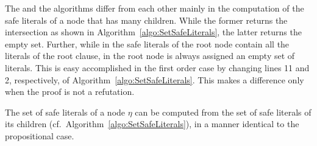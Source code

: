 The {\RPI} and the {\RP} algorithms differ from each other mainly in the
computation of the safe literals of a node that has many children. While the former 
returns the intersection as shown in Algorithm~\ref{algo:SetSafeLiterals}, the latter
returns the empty set. 
Further, while in {\RPI} the safe literals of the root node contain all the literals of the root clause, in {\RP} the root node is always assigned an empty set of literals. 
This is easy accomplished in the first order case by changing lines 11 and 2, respectively, of Algorithm~\ref{algo:SetSafeLiterals}.
This makes a difference only when the proof is not a refutation.

The set of safe literals of a node $\eta$ can be computed from the set of safe literals of its children (cf.\ Algorithm~\ref{algo:SetSafeLiterals}), in a manner identical to the propositional case.






